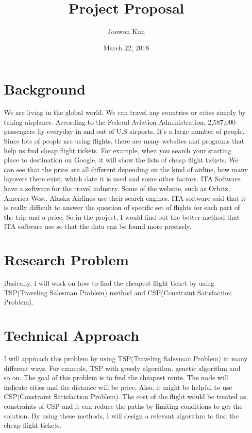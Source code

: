 \documentclass[12pt]{article}
\begin{document}
\title{Project Proposal}
\author{Joowon Kim}
\date{March 22, 2018}
\maketitle
\section{Background}
We are living in the global world. We can travel any countries or cities simply by taking airplanes. According to the Federal Aviation Administration, 2,587,000 passengers fly everyday in and out of U.S airports. \cite{stat} It's a large number of people. Since lots of people are using flights, there are many websites and programs that help us find cheap flight tickets. For example, when you search your starting place to destination on Google, it will show the lists of cheap flight tickets. We can see that the price are all different depending on the kind of airline, how many layovers there exist, which date it is used and some other factors. ITA Software \cite{techreport} have a software for the travel industry. Some of the website, such as Orbitz, America West, Alaska Airlines use their search engines. ITA software said that it is really difficult to answer the question of specific set of flights for each part of the trip and a price. So in the project, I would find out the better method that ITA software use so that the data can be found more precisely.
\section{Research Problem}
Basically, I will work on how to find the cheapest flight ticket by using TSP(Traveling Salesman Problem) method and CSP(Constraint Satisfaction Problem). 
\section{Technical Approach}
I will approach this problem by using TSP(Traveling Salesman Problem) in many different ways. For example, TSP with greedy algorithm, genetic algorithm and so on. The goal of this problem is to find the cheapest route. The node will indicate cities and the distance will be price. Also, it might be helpful to use CSP(Constraint Satisfaction Problem). The cost of the flight would be treated as constraints of CSP and it can reduce the paths by limiting conditions to get the solution. By using these methods, I will design a relevant algorithm to find the cheap flight tickets. 
\end{document}
